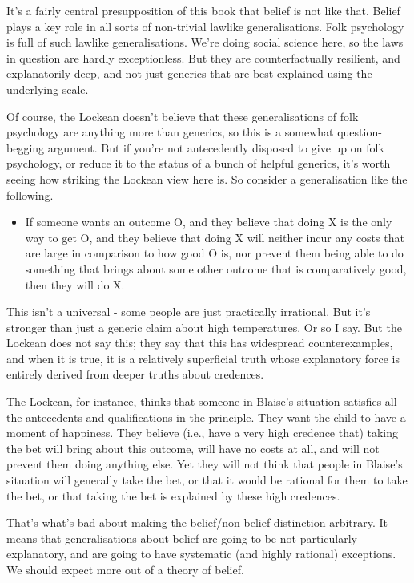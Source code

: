 \documentclass[11pt,]{book}
\providecommand{\tightlist}{%
  \setlength{\itemsep}{0pt}\setlength{\parskip}{0pt}}
\begin{document}
It's a fairly central presupposition of this book that belief is not like that. Belief plays a key role in all sorts of non-trivial lawlike generalisations. Folk psychology is full of such lawlike generalisations. We're doing social science here, so the laws in question are hardly exceptionless. But they are counterfactually resilient, and explanatorily deep, and not just generics that are best explained using the underlying scale.

Of course, the Lockean doesn't believe that these generalisations of folk psychology are anything more than generics, so this is a somewhat question-begging argument. But if you're not antecedently disposed to give up on folk psychology, or reduce it to the status of a bunch of helpful generics, it's worth seeing how striking the Lockean view here is. So consider a generalisation like the following.

\begin{itemize}
\tightlist
\item
  If someone wants an outcome O, and they believe that doing X is the only way to get O, and they believe that doing X will neither incur any costs that are large in comparison to how good O is, nor prevent them being able to do something that brings about some other outcome that is comparatively good, then they will do X.
\end{itemize}

This isn't a universal - some people are just practically irrational. But it's stronger than just a generic claim about high temperatures. Or so I say. But the Lockean does not say this; they say that this has widespread counterexamples, and when it is true, it is a relatively superficial truth whose explanatory force is entirely derived from deeper truths about credences.

The Lockean, for instance, thinks that someone in Blaise's situation satisfies all the antecedents and qualifications in the principle. They want the child to have a moment of happiness. They believe (i.e., have a very high credence that) taking the bet will bring about this outcome, will have no costs at all, and will not prevent them doing anything else. Yet they will not think that people in Blaise's situation will generally take the bet, or that it would be rational for them to take the bet, or that taking the bet is explained by these high credences.

That's what's bad about making the belief/non-belief distinction arbitrary. It means that generalisations about belief are going to be not particularly explanatory, and are going to have systematic (and highly rational) exceptions. We should expect more out of a theory of belief.
\end{document}
